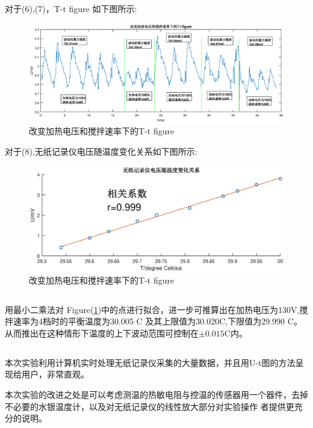 ﻿\documentclass[10.5pt]{ctexart}
\begin{document}
对于(6),(7)，T-t figure 如下图所示:
\begin{figure}[!ht]
\centering
\caption{改变加热电压和搅拌速率下的T-t figure}
\includegraphics[width=400pt]{ConstTemperature/Figure5.eps}
\end{figure}


对于(8),无纸记录仪电压随温度变化关系如下图所示:
\begin{figure}[!ht]
\centering
\caption{改变加热电压和搅拌速率下的T-t figure \label{fig:UT}}
\includegraphics[width=400pt]{ConstTemperature/Figure6.eps}
\end{figure}
\newpage
\subsection{\textbf{}}

用最小二乘法对 Figure(\ref{fig:UT})中的点进行拟合，进一步可推算出在加热电压为130V,搅拌速率为4档时的平衡温度为30.005 \degree C
及其上限值为30.020\degree C,下限值为29.990 \degree C。从而推出在这种情形下温度的上下波动范围可控制在$\pm0.015$\degree C内。
\subsection{\textbf{}}
本次实验利用计算机实时处理无纸记录仪采集的大量数据，并且用U-t图的方法呈现给用户，非常直观。

本次实验的改进之处是可以考虑测温的热敏电阻与控温的传感器用一个器件，去掉不必要的水银温度计，以及对无纸记录仪的线性放大部分对实验操作
者提供更充分的说明。
\end{document}
